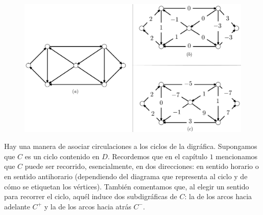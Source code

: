 \begin{figure}[H]
    \centering
    \includegraphics[scale=0.2]{img/imgchapter2/circulacion.jpg}
    \caption{}
    \label{fig:circulacion}
\end{figure}


Hay una manera de asociar circulaciones a los ciclos de la digráfica. Supongamos que $C$ es un ciclo contenido en $D$. Recordemos que en el capítulo $1$ mencionamos que $C$ puede ser recorrido, esencialmente, en dos direcciones: en sentido horario o en sentido antihorario (dependiendo del diagrama que representa al ciclo y de cómo se etiquetan los vértices). También comentamos que, al elegir un sentido para recorrer el ciclo, aquél induce dos subdigráficas de $C$:  la de los arcos hacia adelante $C^{+}$ y la de los arcos hacia atrás $C^{-}$.

